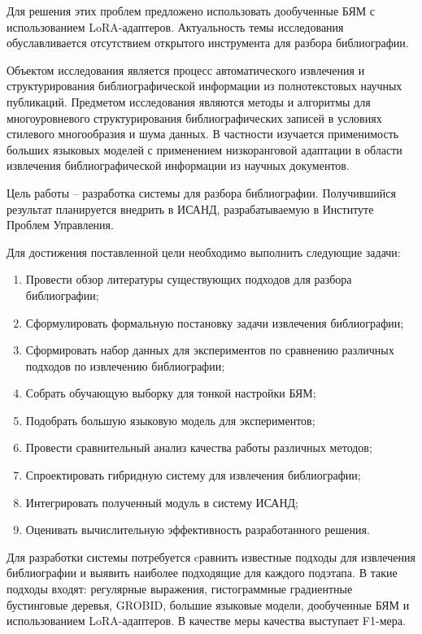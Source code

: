 Для решения этих проблем предложено использовать дообученные БЯМ с использованием LoRA-адаптеров. Актуальность темы исследования обуславливается отсутствием открытого инструмента для разбора библиографии.

Объектом исследования является процесс автоматического извлечения и структурирования библиографической информации из полнотекстовых научных публикаций. Предметом исследования являются методы и алгоритмы для многоуровневого структурирования библиографических записей в условиях стилевого многообразия и шума данных. В частности изучается применимость больших языковых моделей с применением низкоранговой адаптации в области извлечения библиографической информации из научных документов.

Цель работы -- разработка системы для разбора библиографии. Получившийся результат планируется внедрить в ИСАНД\cite{губанов2024информационная}, разрабатываемую в Институте Проблем Управления.

Для достижения поставленной цели необходимо выполнить следующие задачи:
\begin{enumerate}
    \item Провести обзор литературы существующих подходов для разбора библиографии;
    \item Сформулировать формальную постановку задачи извлечения библиографии;
    \item Сформировать набор данных для экспериментов по сравнению различных подходов по извлечению библиографии;
    \item Собрать обучающую выборку для тонкой настройки БЯМ;    
    \item Подобрать большую языковую модель для экспериментов;
    \item Провести сравнительный анализ качества работы различных методов;
    \item Спроектировать гибридную систему для извлечения библиографии;
    \item Интегрировать полученный модуль в систему ИСАНД;
    \item Оценивать вычислительную эффективность разработанного решения.
\end{enumerate}

Для разработки системы потребуется cравнить известные подходы для извлечения библиографии и  выявить наиболее подходящие для каждого подэтапа. В такие подходы входят: регулярные выражения, гистограммные градиентные бустинговые деревья\cite{kopanichuk2025structure}, GROBID\cite{romary2015grobid}, большие языковые модели, дообученные БЯМ и использованием LoRA-адаптеров. В качестве меры качества выступает F1-мера.

